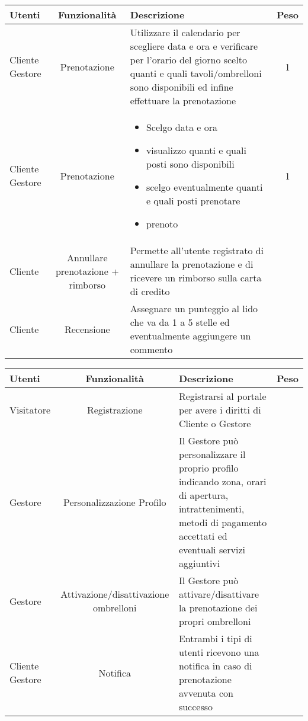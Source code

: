 \documentclass[a4paper]{article}
\begin{document}
\begin{tabularx}{\textwidth}{p{}cXc}
\toprule
Utenti & Funzionalità & Descrizione & Peso \\

\midrule
Cliente \newline Gestore & Prenotazione & Utilizzare il calendario per scegliere data e ora e verificare per l’orario del giorno scelto quanti e quali tavoli/ombrelloni
sono disponibili ed infine effettuare la prenotazione & 1\\

\midrule
Cliente \newline Gestore & Prenotazione & 
\begin{itemize}
\item Scelgo data e ora
\item visualizzo quanti e quali posti sono disponibili
\item scelgo eventualmente quanti e quali posti prenotare
\item prenoto
\end{itemize}
& 1\\

\midrule
Cliente & Annullare prenotazione + rimborso & Permette all'utente registrato di annullare la prenotazione e di ricevere un rimborso sulla carta di credito\\

\midrule
Cliente & Recensione & Assegnare un punteggio al lido che va da 1 a 5 stelle ed eventualmente aggiungere un commento\\


\bottomrule
\end{tabularx}

\newpage
\begin{tabularx}{\textwidth}{p{}cXc}

\toprule
Utenti & Funzionalità & Descrizione & Peso \\

\midrule
Visitatore & Registrazione & Registrarsi al portale per avere i diritti di Cliente o Gestore\\

\midrule
Gestore & Personalizzazione Profilo & Il Gestore può personalizzare il proprio profilo indicando zona, orari di apertura, intrattenimenti, metodi di pagamento accettati ed eventuali servizi aggiuntivi\\

\midrule
Gestore & Attivazione/disattivazione ombrelloni & Il Gestore può attivare/disattivare la prenotazione dei propri ombrelloni\\

\midrule
Cliente \newline Gestore & Notifica & Entrambi i tipi di utenti ricevono una notifica in caso di prenotazione avvenuta con successo\\






\end{tabularx}
\end{document}
